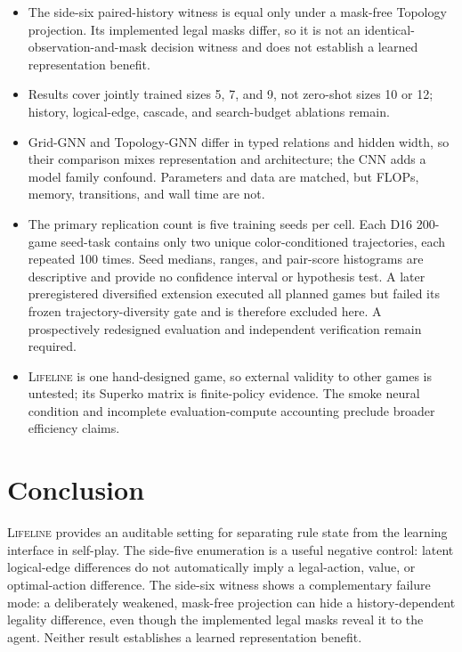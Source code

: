 \documentclass[10pt,letterpaper]{article}
\newcommand{\lifeline}{\textsc{Lifeline}}
\begin{document}
\begin{itemize}
  \item The side-six paired-history witness is equal only under a mask-free
  Topology projection. Its implemented legal masks differ, so it is not an
  identical-observation-and-mask decision witness and does not establish a
  learned representation benefit.
  \item Results cover jointly trained sizes 5, 7, and 9, not zero-shot sizes 10
  or 12; history, logical-edge, cascade, and search-budget ablations remain.
  \item Grid-GNN and Topology-GNN differ in typed relations and hidden width, so
  their comparison mixes representation and architecture; the CNN adds a model
  family confound. Parameters and data are matched, but FLOPs, memory,
  transitions, and wall time are not.
  \item The primary replication count is five training seeds per cell. Each D16
  200-game seed-task contains only two unique color-conditioned trajectories,
  each repeated 100 times. Seed medians, ranges, and pair-score histograms are
  descriptive and provide no confidence interval or hypothesis test. A later
  preregistered diversified extension executed all planned games but failed its
  frozen trajectory-diversity gate and is therefore excluded here. A
  prospectively redesigned evaluation and independent verification remain
  required.
  \item \lifeline{} is one hand-designed game, so external validity to other
  games is untested; its Superko matrix is finite-policy evidence. The smoke
  neural condition and incomplete evaluation-compute accounting preclude
  broader efficiency claims.
\end{itemize}

\section{Conclusion}
\label{sec:conclusion}

\lifeline{} provides an auditable setting for separating rule state from the
learning interface in self-play. The side-five enumeration is a useful
negative control: latent logical-edge differences do not automatically imply
a legal-action, value, or optimal-action difference. The side-six witness
shows a complementary failure mode: a deliberately weakened, mask-free
projection can hide a history-dependent legality difference, even though the
implemented legal masks reveal it to the agent. Neither result establishes a
learned representation benefit.
\end{document}
